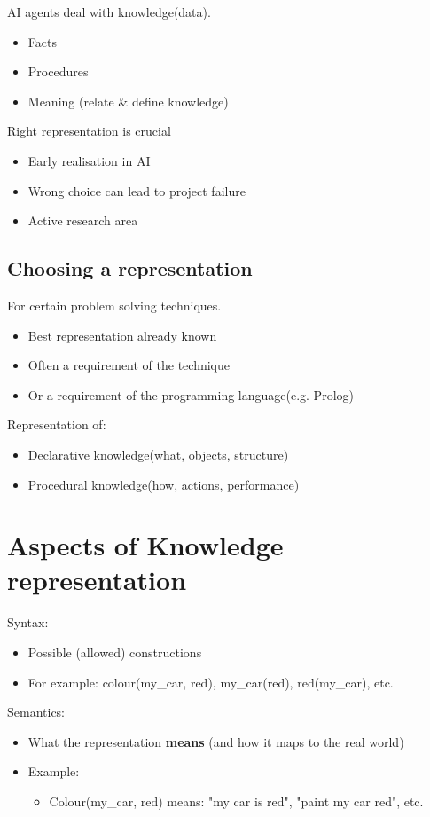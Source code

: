 AI agents deal with knowledge(data).
\begin{itemize}
\item Facts
\item Procedures
\item Meaning (relate \& define knowledge)
\end{itemize}

Right representation is crucial 
\begin{itemize}
\item Early realisation in AI
\item Wrong choice can lead to project failure
\item Active research area
\end{itemize}

\subsection{Choosing a representation}
For certain problem solving techniques.
\begin{itemize}
\item Best representation already known
\item Often a requirement of the technique
\item Or a requirement of the programming language(e.g. Prolog)
\end{itemize}

Representation of:
\begin{itemize}
\item Declarative knowledge(what, objects, structure)
\item Procedural knowledge(how, actions, performance)
\end{itemize}

\section{Aspects of Knowledge representation}
Syntax:
\begin{itemize}
\item Possible (allowed) constructions
\item For example: colour(my\_car, red), my\_car(red), red(my\_car), etc.
\end{itemize}

Semantics:
\begin{itemize}
\item What the representation \textbf{means} (and how it maps to the real world)
\item Example:
\begin{itemize}
\item Colour(my\_car, red) means: "my car is red", "paint my car red", etc.
\end{itemize}
\end{itemize}

